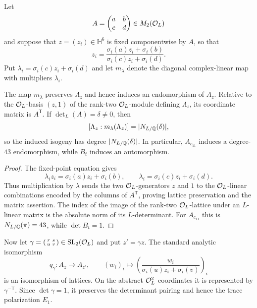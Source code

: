 Let
\[
 A=\begin{pmatrix}a&b\\ c&d\end{pmatrix}\in M_2(\mathcal O_L)
\]
and suppose that $z=(z_i)\in\mathbb H^6$ is fixed componentwise by $A$, so that
\[
 z_i=\frac{\sigma_i(a)z_i+\sigma_i(b)}{\sigma_i(c)z_i+\sigma_i(d)}.
\]
Put $\lambda_i=\sigma_i(c)z_i+\sigma_i(d)$ and let $m_\lambda$ denote the diagonal complex-linear map with multipliers $\lambda_i$.

\begin{proposition}\label{prop:fixedmatrixlattice}
The map $m_\lambda$ preserves $\Lambda_z$ and hence induces an endomorphism of $A_z$.  Relative to the $\mathcal O_L$-basis $(z,1)$ of the rank-two $\mathcal O_L$-module defining $\Lambda_z$, its coordinate matrix is $A^{\mathsf T}$.  If $\det_L(A)=\delta\ne0$, then
\[
 [\Lambda_z:m_\lambda(\Lambda_z)]=|N_{L/\mathbb Q}(\delta)|,
\]
so the induced isogeny has degree $|N_{L/\mathbb Q}(\delta)|$.  In particular, $A_{c_{11}}$ induces a degree-$43$ endomorphism, while $B_t$ induces an automorphism.
\end{proposition}
\begin{proof}
The fixed-point equation gives
\[
 \lambda_i z_i=\sigma_i(a)z_i+\sigma_i(b),\qquad
 \lambda_i=\sigma_i(c)z_i+\sigma_i(d).
\]
Thus multiplication by $\lambda$ sends the two $\mathcal O_L$-generators $z$ and $1$ to the $\mathcal O_L$-linear combinations encoded by the columns of $A^{\mathsf T}$, proving lattice preservation and the matrix assertion.  The index of the image of the rank-two $\mathcal O_L$-lattice under an $L$-linear matrix is the absolute norm of its $L$-determinant.  For $A_{c_{11}}$ this is $N_{L/\mathbb Q}(\pi)=43$, while $\det B_t=1$.
\end{proof}

Now let $\gamma=\left(\begin{smallmatrix}r&s\\u&v\end{smallmatrix}\right)\in\mathrm{SL}_2(\mathcal O_L)$ and put $z'=\gamma z$.  The standard analytic isomorphism
\[
 q_\gamma:A_z\longrightarrow A_{z'},\qquad
 (w_i)_i\longmapsto\left(\frac{w_i}{\sigma_i(u)z_i+\sigma_i(v)}\right)_i
\]
is an isomorphism of lattices.  On the abstract $\mathcal O_L^2$ coordinates it is represented by $\gamma^{-\mathsf T}$.  Since $\det\gamma=1$, it preserves the determinant pairing and hence the trace polarization $E_1$.

